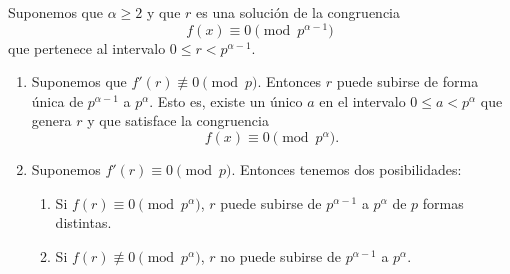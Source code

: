 \documentclass[12pt,a4paper]{book}
\begin{document}
    \begin{teorema}
        Suponemos que $\alpha\geq2$ y que $r$ es una solución de la congruencia
        \begin{equation}
            f(x)\equiv0\pmod{p^{\alpha-1}}
        \end{equation}
        que pertenece al intervalo $0\leq r<p^{\alpha-1}$.
        \begin{enumerate}
            \item[(a)] Suponemos que $f'(r)\not\equiv0\pmod{p}$. Entonces $r$ puede
            subirse de forma única de $p^{\alpha-1}$ a $p^{\alpha}$. Esto es, existe un
            único $a$ en el intervalo $0\leq a<p^{\alpha}$ que genera $r$ y que satisface
            la congruencia
            \begin{equation}
                f(x)\equiv0\pmod{p^{\alpha}}.
            \end{equation}
            \item[(b)] Suponemos $f'(r)\equiv0\pmod{p}$. Entonces tenemos dos
            posibilidades:
            \begin{enumerate}
                \item[(b$_{1}$)] Si $f(r)\equiv0\pmod{p^{\alpha}}$, $r$ puede subirse de
                $p^{\alpha-1}$ a $p^{\alpha}$ de $p$ formas distintas.
                \item[(b$_{2}$)] Si $f(r)\not\equiv0\pmod{p^{\alpha}}$, $r$ no puede subirse
                de $p^{\alpha-1}$ a $p^{\alpha}$.
            \end{enumerate}
        \end{enumerate}
    \end{teorema}
\end{document}
